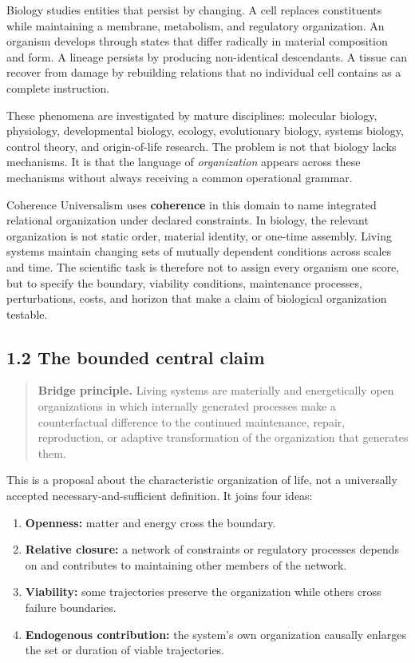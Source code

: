 \documentclass[
  11pt,
]{article}
\providecommand{\tightlist}{%
  \setlength{\itemsep}{0pt}\setlength{\parskip}{0pt}}
\begin{document}
Biology studies entities that persist by changing. A cell replaces
constituents while maintaining a membrane, metabolism, and regulatory
organization. An organism develops through states that differ radically
in material composition and form. A lineage persists by producing
non-identical descendants. A tissue can recover from damage by
rebuilding relations that no individual cell contains as a complete
instruction.

These phenomena are investigated by mature disciplines: molecular
biology, physiology, developmental biology, ecology, evolutionary
biology, systems biology, control theory, and origin-of-life research.
The problem is not that biology lacks mechanisms. It is that the
language of \emph{organization} appears across these mechanisms without
always receiving a common operational grammar.

Coherence Universalism uses \textbf{coherence} in this domain to name
integrated relational organization under declared constraints. In
biology, the relevant organization is not static order, material
identity, or one-time assembly. Living systems maintain changing sets of
mutually dependent conditions across scales and time. The scientific
task is therefore not to assign every organism one score, but to specify
the boundary, viability conditions, maintenance processes,
perturbations, costs, and horizon that make a claim of biological
organization testable.

\subsection{1.2 The bounded central
claim}\label{the-bounded-central-claim}

\begin{quote}
\textbf{Bridge principle.} Living systems are materially and
energetically open organizations in which internally generated processes
make a counterfactual difference to the continued maintenance, repair,
reproduction, or adaptive transformation of the organization that
generates them.
\end{quote}

This is a proposal about the characteristic organization of life, not a
universally accepted necessary-and-sufficient definition. It joins four
ideas:

\begin{enumerate}
\def\labelenumi{\arabic{enumi}.}
\tightlist
\item
  \textbf{Openness:} matter and energy cross the boundary.
\item
  \textbf{Relative closure:} a network of constraints or regulatory
  processes depends on and contributes to maintaining other members of
  the network.
\item
  \textbf{Viability:} some trajectories preserve the organization while
  others cross failure boundaries.
\item
  \textbf{Endogenous contribution:} the system's own organization
  causally enlarges the set or duration of viable trajectories.
\end{enumerate}
\end{document}
